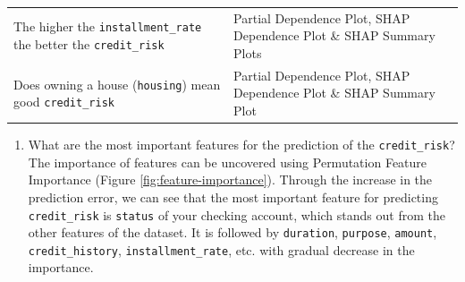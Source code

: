 \documentclass[
]{article}
\newenvironment{Shaded}{\begin{snugshade}}{\end{snugshade}}
\newcommand{\DataTypeTok}[1]{\textcolor[rgb]{0.13,0.29,0.53}{#1}}
\newcommand{\KeywordTok}[1]{\textcolor[rgb]{0.13,0.29,0.53}{\textbf{#1}}}
\newcommand{\NormalTok}[1]{#1}
\newcommand{\OperatorTok}[1]{\textcolor[rgb]{0.81,0.36,0.00}{\textbf{#1}}}
\newcommand{\StringTok}[1]{\textcolor[rgb]{0.31,0.60,0.02}{#1}}
\providecommand{\tightlist}{%
  \setlength{\itemsep}{0pt}\setlength{\parskip}{0pt}}
\begin{document}
\begin{longtable}[]{@{}ll@{}}
\begin{minipage}[t]{0.47\columnwidth}
The higher the \texttt{installment\_rate} the better the \texttt{credit\_risk}\strut
\end{minipage} & \begin{minipage}[t]{0.47\columnwidth}\raggedright
Partial Dependence Plot, SHAP Dependence Plot \& SHAP Summary Plots\strut
\end{minipage}\tabularnewline
\begin{minipage}[t]{0.47\columnwidth}\raggedright
Does owning a house (\texttt{housing}) mean good \texttt{credit\_risk}\strut
\end{minipage} & \begin{minipage}[t]{0.47\columnwidth}\raggedright
Partial Dependence Plot, SHAP Dependence Plot \& SHAP Summary Plot\strut
\end{minipage}\tabularnewline
\bottomrule
\end{longtable}

\begin{enumerate}
\def\labelenumi{\arabic{enumi}.}
\tightlist
\item
  What are the most important features for the prediction of the \texttt{credit\_risk}?\\
  The importance of features can be uncovered using Permutation Feature Importance (Figure \ref{fig:feature-importance}). Through the increase in the prediction error, we can see that the most important feature for predicting \texttt{credit\_risk} is \texttt{status} of your checking account, which stands out from the other features of the dataset. It is followed by \texttt{duration}, \texttt{purpose}, \texttt{amount}, \texttt{credit\_history}, \texttt{installment\_rate}, etc. with gradual decrease in the importance.
\end{enumerate}

\begin{Shaded}
\end{Shaded}
\end{document}
